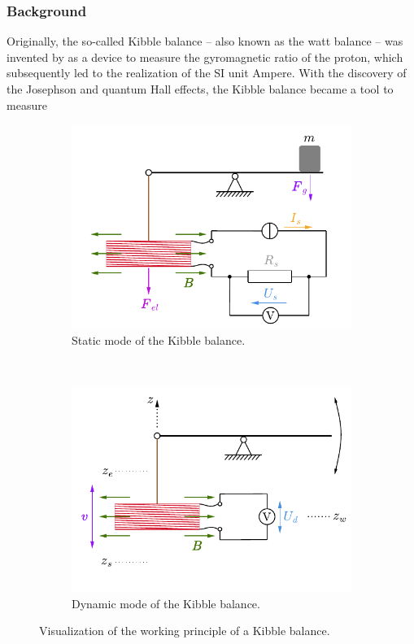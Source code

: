 \documentclass{article}
\begin{document}
\subsubsection*{Background} %
Originally, the so-called Kibble balance – also known as the watt balance – was invented by \cite{Kibble1976} as a device to measure the gyromagnetic ratio of the proton, which subsequently led to the realization of the SI unit Ampere. With the discovery of the Josephson and quantum Hall effects, the Kibble balance became a tool to measure 
\begin{figure}
	\centering
	\begin{subfigure}{0.34\textwidth}
		\centering
		\includegraphics[width=\textwidth]{figures/balancestatic.pdf}
		\caption{Static mode of the Kibble balance.}
		\label{fig:balancestatic}
	\end{subfigure}
	\\
	\begin{subfigure}{0.34\textwidth}
		\centering
		\includegraphics[width=\textwidth]{figures/balancedynamic.pdf}
		\caption{Dynamic mode of the Kibble balance.}
		\label{fig:balancedynamic}
	\end{subfigure}
	\caption{Visualization of the working principle of a Kibble balance.}
	\label{fig:kibblebalanceprinciple}
\end{figure}
\end{document}
